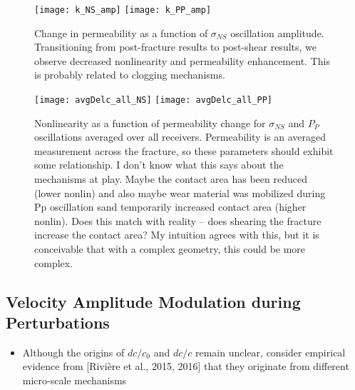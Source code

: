 \documentclass[letterpaper,10pt]{article}
\begin{document}
\newpage

\begin{figure}[ht]
	\centering
	\texttt{[image: k\_NS\_amp]}
	\texttt{[image: k\_PP\_amp]}
	\caption{Change in permeability as a function of $ \sigma_{NS} $ oscillation amplitude. Transitioning from post-fracture results to post-shear results, we observe decreased nonlinearity and permeability enhancement. This is probably related to clogging mechanisms.}%
	\label{fig:perm_ns_amp}
\end{figure}

\newpage


\begin{figure}[ht]
	\centering
	\texttt{[image: avgDelc\_all\_NS]}
	\texttt{[image: avgDelc\_all\_PP]}
	\caption{Nonlinearity as a function of permeability change for $ \sigma_{NS} $ and $ P_P $ oscillations averaged over all receivers. Permeability is an averaged measurement across the fracture, so these parameters should exhibit some relationship. I don’t know what this says about the mechanisms at play. Maybe the contact area has been reduced (lower nonlin) and also maybe wear material was mobilized during Pp oscillation sand temporarily increased contact area (higher nonlin). Does this match with reality -- does shearing the fracture increase the contact area? My intuition agrees with this, but it is conceivable that with a complex geometry, this could be more complex.}
	\label{fig:delc_plots2}
\end{figure}

\newpage


\subsection{Velocity Amplitude Modulation during Perturbations}




\begin{itemize}
	\item Although the origins of $dc/c_0 $ and $ dc/c $ remain unclear, consider empirical evidence from [Rivière et al., 2015, 2016] that they originate from different micro-scale mechanisms 
\end{itemize}
\end{document}
